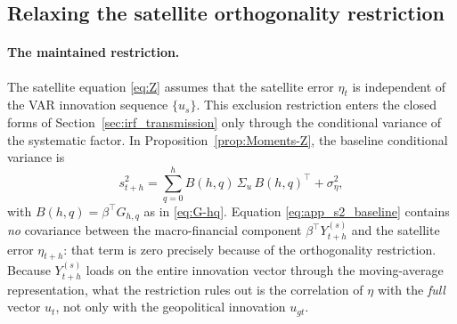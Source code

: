 
\subsection{Relaxing the satellite orthogonality restriction}
\label{app:orthogonality}

\paragraph{The maintained restriction.}
The satellite equation \eqref{eq:Z} assumes that the satellite error $\eta_t$ is
independent of the VAR innovation sequence $\{u_s\}$. This exclusion restriction
enters the closed forms of Section~\ref{sec:irf_transmission} only through the
conditional variance of the systematic factor. In
Proposition~\ref{prop:Moments-Z}, the baseline conditional variance is
\begin{equation}
    s_{t+h}^2
    =
    \sum_{q=0}^{h} B(h,q)\,\Sigma_u\, B(h,q)^\top
    +
    \sigma_\eta^2 ,
    \label{eq:app_s2_baseline}
\end{equation}
with $B(h,q)=\beta^\top G_{h,q}$ as in \eqref{eq:G-hq}. Equation
\eqref{eq:app_s2_baseline} contains \emph{no} covariance between the
macro-financial component $\beta^\top Y_{t+h}^{(s)}$ and the satellite error
$\eta_{t+h}$: that term is zero precisely because of the orthogonality
restriction. Because $Y_{t+h}^{(s)}$ loads on the entire innovation vector
through the moving-average representation, what the restriction rules out is the
correlation of $\eta$ with the \emph{full} vector $u_t$, not only with the
geopolitical innovation $u_{gt}$.


